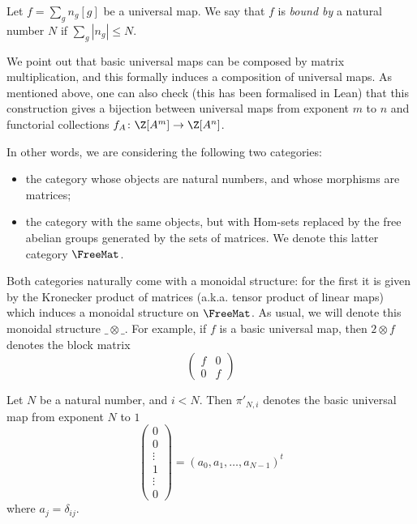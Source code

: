 \begin{definition}
  \label{universal_map_bound_by}
  \leanok
  Let $f = \sum_g n_g[g]$ be a universal map.
  We say that $f$ is \emph{bound by} a natural number $N$
  if $\sum_g |n_g| \le N$.
\end{definition}

We point out that basic universal maps can be composed by matrix multiplication,
and this formally induces a composition of universal maps.
As mentioned above, one can also check (this has been formalised in Lean)
that this construction gives a bijection
between universal maps from exponent $m$ to $n$
and functorial collections $f_A \colon \Z[A^m]\to\Z[A^n]$.

\begin{definition}
  \label{FreeMat}
  \leanok
  In other words, we are considering the following two categories:
  \begin{itemize}
    \item
      the category whose objects are natural numbers,
      and whose morphisms are matrices;
    \item
      the category with the same objects,
      but with Hom-sets replaced by the free abelian groups
      generated by the sets of matrices.
      We denote this latter category $\FreeMat$.
  \end{itemize}
\end{definition}

Both categories naturally come with a monoidal structure:
for the first it is given by the Kronecker product of matrices
(a.k.a. tensor product of linear maps)
which induces a monoidal structure on $\FreeMat$.
As usual, we will denote this monoidal structure $\_ \otimes \_$.
For example, if $f$ is a basic universal map,
then $2 \otimes f$ denotes the block matrix
\[
  \begin{pmatrix}
    f & 0 \\
    0 & f
  \end{pmatrix}
\]

\begin{definition}
  \label{proj_aux}
  \leanok
  Let $N$ be a natural number, and $i < N$.
  Then $\pi'_{N,i}$ denotes the basic universal map
  from exponent $N$ to $1$
  \[
   \begin{pmatrix} 
    0 \\
    0 \\
    \vdots \\
    1 \\
    \vdots \\
    0
   \end{pmatrix} 
   =
   (a_0, a_1, \ldots, a_{N-1})^t
  \]
  where $a_j = \delta_{ij}$.
\end{definition}

